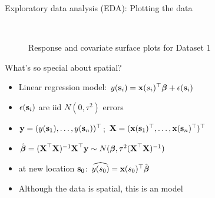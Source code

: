 \begin{frame}{Exploratory data analysis (EDA): Plotting the data}
\begin{figure}
	\\
	\caption{Response and covariate surface plots for Dataset 1}
\end{figure}
\end{frame}

\begin{frame}{What's so special about spatial?}
	\begin{itemize}
		\item Linear regression model: $y(\textbf{s}_i)=\textbf{x}(s_i)^\top\mbox{\boldmath $ \beta $} + \epsilon(\textbf{s}_i)$
		\item $\epsilon(\textbf{s}_i)$ are iid $N(0,\tau^2)$ errors 
		\item $\textbf{y}=(y(\textbf{s}_1),\ldots,y(\textbf{s}_n))^\top$;  $\textbf{X}=(\textbf{x}(\textbf{s}_1)^\top,\ldots,\textbf{x}(\textbf{s}_n)^\top)^\top$
		\item {} $\hat{\mbox{\boldmath $ \beta $}} = (\textbf{X}^\top\textbf{X})^{-1}\textbf{X}^\top\textbf{y} \sim N(\mbox{\boldmath $ \beta $}, \tau^2 (\textbf{X}^\top\textbf{X})^{-1})$
		\item {} at new location $\textbf{s}_0$: $\widehat{y(s_0)} = \textbf{x}(s_0)^\top\hat{\mbox{\boldmath $ \beta $}}$
		\item Although the data is spatial, this is an  model
	\end{itemize}
\end{frame}

